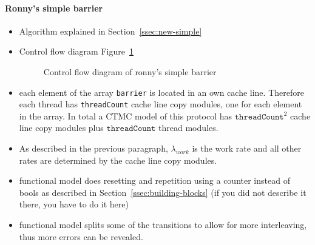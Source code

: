 \documentclass[a4paper, 10pt]{article}
\begin{document}
\begin{enumerate}
\paragraph{Ronny's simple barrier}
\label{ssssec:analysis-modelchecking-modelling-ronny-simple}
\begin{itemize}
	\item Algorithm explained in Section~\ref{ssec:new-simple}
	\item Control flow diagram Figure~\ref{fig:ronny-simple-control-flow}
		\begin{figure}[htbp]
			\centering
			
			\caption{Control flow diagram of ronny's simple barrier}
			\label{fig:ronny-simple-control-flow}
		\end{figure}
	\item each element of the array \texttt{barrier} is located in an own cache line. Therefore each thread has \texttt{threadCount} cache line copy modules, one for each element in the array. In total a CTMC model of this protocol has $\mathtt{threadCount}^2$ cache line copy modules plus $\mathtt{threadCount}$ thread modules.
	\item As described in the previous paragraph, $\lambda_{work}$ is the work rate and all other rates are determined by the cache line copy modules.
	\item functional model does resetting and repetition using a counter instead of bools as described in Section~\ref{ssec:building-blocks} (if you did not describe it there, you have to do it here)
	\item functional model splits some of the transitions to allow for more interleaving, thus more errors can be revealed.
\end{itemize}


\end{enumerate}
\end{document}
